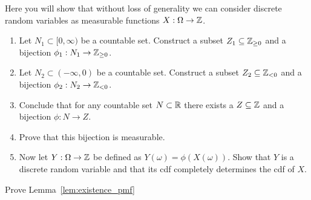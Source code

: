 \begin{problem}\label{prb:discrete_rv_on_Z}
Here you will show that without loss of generality we can consider discrete random variables as measurable functions $X: \Omega \to \mathbb Z$.

\begin{enumerate}[label=(\alph*)]
\item Let $N_1 \subset [0,\infty)$ be a countable set. Construct a subset $Z_1 \subseteq \mathbb Z_{\ge 0}$ and a bijection $\phi_1 : N_1 \to \mathbb Z_{\ge 0}$.
\item Let $N_2 \subset (-\infty,0)$ be a countable set. Construct a subset $Z_2 \subseteq \mathbb Z_{< 0}$ and a bijection $\phi_2 : N_2 \to \mathbb Z_{< 0}$.
\item Conclude that for any countable set $N \subset \mathbb R$ there exists a $Z \subseteq \mathbb Z$ and a bijection $\phi : N \to Z$. 
\item Prove that this bijection is measurable.
\item Now let $Y : \Omega \to \mathbb Z$ be defined as $Y(\omega) = \phi(X(\omega))$. Show that $Y$ is a discrete random variable and that its cdf completely determines the cdf of $X$.
\end{enumerate}
\end{problem}

\begin{problem}\label{prb:discrete_rv_has_pmf}
Prove Lemma~\ref{lem:existence_pmf}
\end{problem}

